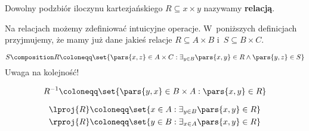 \begin{definition}[Relacja]
	Dowolny podzbiór iloczynu kartezjańskiego \(R \subseteq x \times y\) nazywamy \textbf{relacją}.
\end{definition}
Na relacjach możemy zdefiniować intuicyjne operacje. W~poniższych definicjach przyjmujemy, że mamy już dane jakieś relacje \(R \subseteq A \times B\) i~\(S \subseteq B \times C\).
\begin{definition}
	\begin{equation*}
		S \composition R
		\coloneqq \set{\pars{x, z} \in A \times C : \exists_{y \in B} \pars{x, y} \in R \land \pars{y, z} \in S}
	\end{equation*}
	Uwaga na kolejność!
\end{definition}
\begin{definition}
	\begin{equation*}
		R^{-1} \coloneqq \set{\pars{y, x} \in B \times A : \pars{x, y} \in R}
	\end{equation*}
\end{definition}
\begin{definition}[Projekcje]
	\begin{align*}
		\lproj{R} & \coloneqq \set{x \in A : \exists_{y \in B} \pars{x, y} \in R} \\
		\rproj{R} & \coloneqq \set{y \in B : \exists_{x \in A} \pars{x, y} \in R} \\
	\end{align*}
\end{definition}